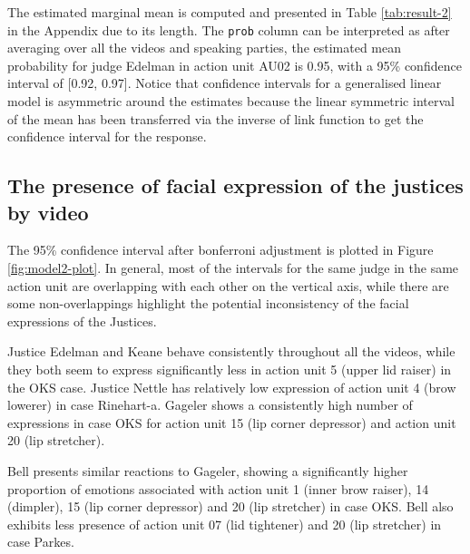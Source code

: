 \documentclass{monashthesis}
\begin{document}
The estimated marginal mean is computed and presented in Table \ref{tab:result-2} in the Appendix due to its length. The \texttt{prob} column can be interpreted as after averaging over all the videos and speaking parties, the estimated mean probability for judge Edelman in action unit AU02 is 0.95, with a 95\% confidence interval of {[}0.92, 0.97{]}. Notice that confidence intervals for a generalised linear model is asymmetric around the estimates because the linear symmetric interval of the mean has been transferred via the inverse of link function to get the confidence interval for the response.

\hypertarget{the-presence-of-facial-expression-of-the-justices-by-video}{%
\subsection{The presence of facial expression of the justices by video}\label{the-presence-of-facial-expression-of-the-justices-by-video}}

The 95\% confidence interval after bonferroni adjustment is plotted in Figure \ref{fig:model2-plot}. In general, most of the intervals for the same judge in the same action unit are overlapping with each other on the vertical axis, while there are some non-overlappings highlight the potential inconsistency of the facial expressions of the Justices.

Justice Edelman and Keane behave consistently throughout all the videos, while they both seem to express significantly less in action unit 5 (upper lid raiser) in the OKS case. Justice Nettle has relatively low expression of action unit 4 (brow lowerer) in case Rinehart-a. Gageler shows a consistently high number of expressions in case OKS for action unit 15 (lip corner depressor) and action unit 20 (lip stretcher).

Bell presents similar reactions to Gageler, showing a significantly higher proportion of emotions associated with action unit 1 (inner brow raiser), 14 (dimpler), 15 (lip corner depressor) and 20 (lip stretcher) in case OKS. Bell also exhibits less presence of action unit 07 (lid tightener) and 20 (lip stretcher) in case Parkes.
\end{document}
